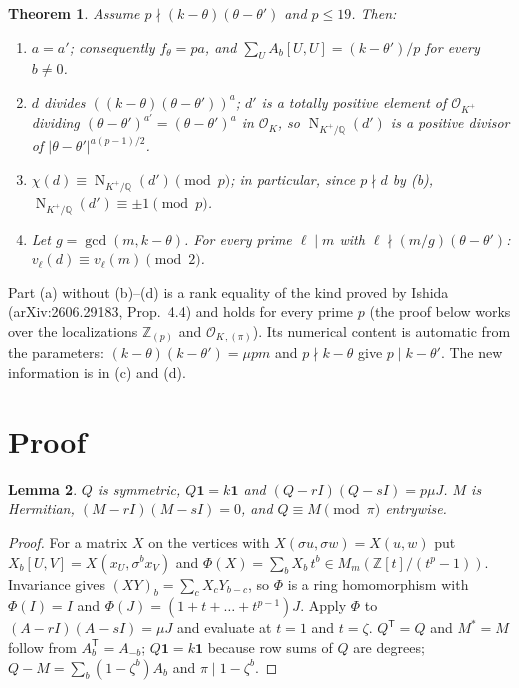 \documentclass[11pt,a4paper]{article}
\newtheorem{theorem}{Theorem}
\newtheorem{lemma}[theorem]{Lemma}
\theoremstyle{remark}
\newcommand{\Z}{\mathbb{Z}}
\newcommand{\Q}{\mathbb{Q}}
\newcommand{\one}{\mathbf{1}}
\newcommand{\OK}{\mathcal{O}_K}
\newcommand{\Nm}{\operatorname{N}}
\begin{document}
\begin{theorem}\label{thm:main}
Assume $p\nmid(k-\theta)(\theta-\theta')$ and $p\le 19$. Then:
\begin{enumerate}
\item[(a)] $a=a'$; consequently $f_\theta=pa$, and $\sum_U A_b[U,U]=(k-\theta')/p$ for every $b\ne0$.
\item[(b)] $d$ divides $((k-\theta)(\theta-\theta'))^a$; $d'$ is a totally positive element of $\mathcal{O}_{K^+}$ dividing
$(\theta-\theta')^{a'}=(\theta-\theta')^a$ in $\OK$, so $\Nm_{K^+/\Q}(d')$ is a positive divisor of $|\theta-\theta'|^{a(p-1)/2}$.
\item[(c)] $\chi(d)\equiv \Nm_{K^+/\Q}(d') \pmod p$; in particular, since $p\nmid d$ by (b), $\Nm_{K^+/\Q}(d')\equiv\pm1\pmod p$.
\item[(d)] Let $g=\gcd(m,k-\theta)$. For every prime $\ell\mid m$ with $\ell\nmid (m/g)(\theta-\theta')$:
$v_\ell(d)\equiv v_\ell(m)\pmod 2$.
\end{enumerate}
\end{theorem}

Part (a) without (b)--(d) is a rank equality of the kind proved by Ishida (arXiv:2606.29183, Prop.~4.4) and holds for
every prime $p$ (the proof below works over the localizations $\Z_{(p)}$ and $\OK{}_{,(\pi)}$). Its numerical content is
automatic from the parameters: $(k-\theta)(k-\theta')=\mu pm$ and $p\nmid k-\theta$ give $p\mid k-\theta'$. The new
information is in (c) and (d).

\section{Proof}

\begin{lemma}\label{lem:Phi}
$Q$ is symmetric, $Q\one=k\one$ and $(Q-rI)(Q-sI)=p\mu J$. $M$ is Hermitian, $(M-rI)(M-sI)=0$, and $Q\equiv M\pmod\pi$ entrywise.
\end{lemma}
\begin{proof}
For a matrix $X$ on the vertices with $X(\sigma u,\sigma w)=X(u,w)$ put $X_b[U,V]=X(x_U,\sigma^b x_V)$ and
$\Phi(X)=\sum_b X_b\,t^b\in M_m(\Z[t]/(t^p-1))$. Invariance gives $(XY)_b=\sum_c X_cY_{b-c}$, so $\Phi$ is a ring
homomorphism with $\Phi(I)=I$ and $\Phi(J)=(1+t+\dots+t^{p-1})J$. Apply $\Phi$ to $(A-rI)(A-sI)=\mu J$ and evaluate at $t=1$
and $t=\zeta$. $Q^{\mathsf T}=Q$ and $M^*=M$ follow from $A_b^{\mathsf T}=A_{-b}$; $Q\one=k\one$ because row sums of $Q$ are
degrees; $Q-M=\sum_b(1-\zeta^b)A_b$ and $\pi\mid 1-\zeta^b$.
\end{proof}
\end{document}
